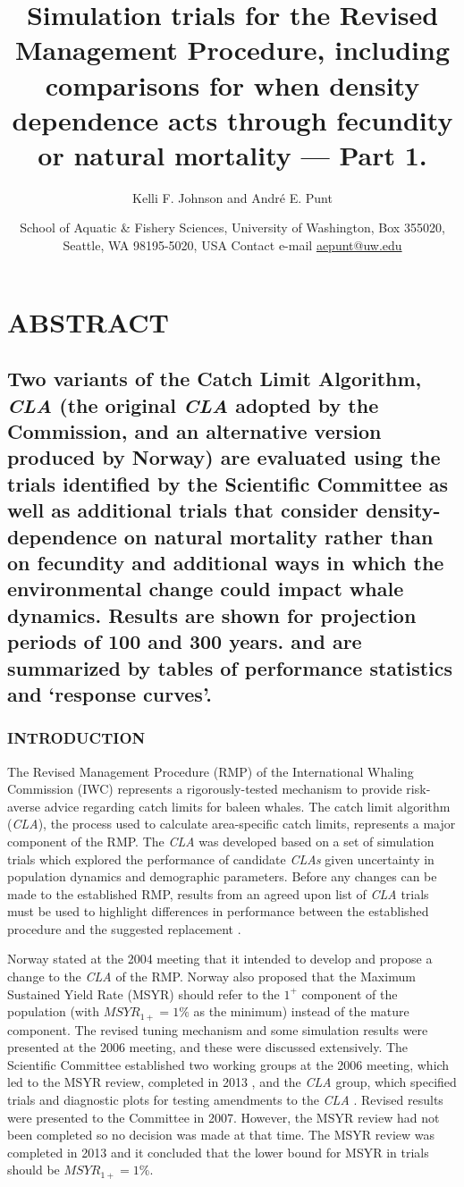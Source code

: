 \documentclass[]{article}
\title{Simulation trials for the Revised Management Procedure, including
comparisons for when density dependence acts through fecundity or
natural mortality --- Part 1.}
\author{Kelli F. Johnson and Andr\'{e} E. Punt}
\date{School of Aquatic \& Fishery Sciences, University of Washington,
Box 355020, Seattle, WA 98195-5020, USA
Contact e-mail \href{mailto:aepunt@uw.edu}{aepunt@uw.edu}}
\begin{document}
\maketitle

\section{ABSTRACT}\label{abstract}

\subsection{Two variants of the Catch Limit Algorithm, \emph{CLA} (the
original \emph{CLA} adopted by the Commission, and an alternative
version produced by Norway) are evaluated using the trials identified by
the Scientific Committee as well as additional trials that consider
density-dependence on natural mortality rather than on fecundity and
additional ways in which the environmental change could impact whale
dynamics. Results are shown for projection periods of 100 and 300 years.
and are summarized by tables of performance statistics and
`response curves'.}

\subsubsection{INTRODUCTION}\label{introduction}

The Revised Management Procedure (RMP) of the International Whaling
Commission (IWC) \autocite{iwc_2013_rmp} represents a rigorously-tested
mechanism to provide risk-averse advice regarding catch limits for
baleen whales. The catch limit algorithm (\emph{CLA}), the process used
to calculate area-specific catch limits, represents a major component of
the RMP. The \emph{CLA} was developed based on a set of
simulation trials which explored the performance of candidate
\emph{CLAs} given uncertainty in population dynamics and demographic
parameters. Before any changes can be made to the established RMP,
results from an agreed upon list of \emph{CLA} trials must be used to
highlight differences in performance between the established procedure
and the suggested replacement \autocite{iwc_2007}.

Norway stated at the 2004 meeting that it intended to develop and
propose a change to the \emph{CLA} of the RMP. Norway also proposed that
the Maximum Sustained Yield Rate (MSYR) should refer to the $1^+$
component of the population (with $MSYR_{1+} = 1\%$ as the minimum)
instead of the mature component. The revised tuning mechanism and some
simulation results were presented at the 2006 meeting, and these were
discussed extensively. The Scientific Committee established two working
groups at the 2006 meeting, which led to the MSYR review,
completed in 2013 \autocite{iwc_2013}, and the \emph{CLA} group,
which specified trials and diagnostic plots for testing amendments
to the \emph{CLA} \autocite{iwc_2007}.
Revised results \autocite{aldrin_2007} were presented to the Committee in 2007.
However, the MSYR review had not been completed so no decision was made
at that time. The MSYR review was completed in 2013 and it concluded
that the lower bound for MSYR in trials should be $MSYR_{1+} = 1\%$.
\end{document}
